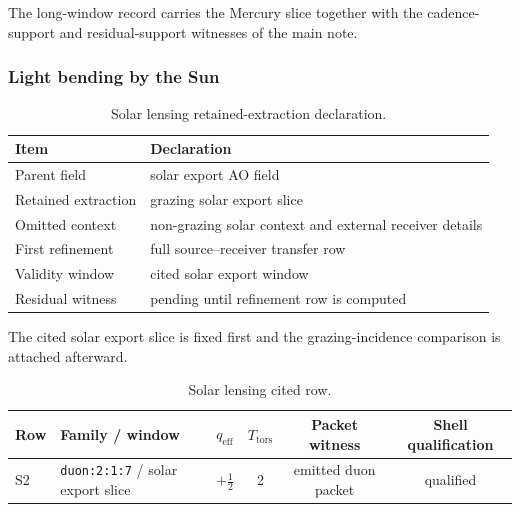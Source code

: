 The long-window record carries the Mercury slice together with the cadence-support and residual-support witnesses of the main note.

\subsubsection{Light bending by the Sun}
\label{man:solar-lensing-witness}

\begin{table}[H]
\centering
\caption{Solar lensing retained-extraction declaration.}
\label{tab:lensing-retention}
\begin{threeparttable}
\begin{tabularx}{\linewidth}{@{}lX@{}}
\toprule
Item & Declaration \\
\midrule
Parent field & solar export AO field \\
Retained extraction & grazing solar export slice \\
Omitted context & non-grazing solar context and external receiver details \\
First refinement & full source--receiver transfer row \\
Validity window & cited solar export window \\
Residual witness & pending until refinement row is computed \\
\bottomrule
\end{tabularx}
\end{threeparttable}
\end{table}

The cited solar export slice is fixed first and the grazing-incidence comparison is attached afterward.

\begin{table}[H]
\centering
\caption{Solar lensing cited row.}
\label{tab:solar-lensing-row}
\begin{threeparttable}
\small
\begin{tabularx}{\linewidth}{@{}lXcccc@{}}
\toprule
Row & Family / window & $q_{\mathrm{eff}}$ & $T_{\mathrm{tors}}$ & Packet witness & Shell qualification \\
\midrule
S2 & \texttt{duon:2:1:7} / solar export slice & $+\frac{1}{2}$ & 2 & emitted duon packet & qualified \\
\bottomrule
\end{tabularx}
\end{threeparttable}
\end{table}

